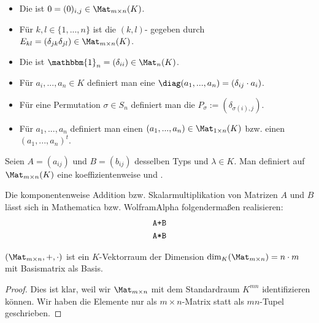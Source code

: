 \begin{example}
	\begin{itemize}
		\item Die  ist $0=(0)_{i,j} \in \Mat_{m\times n}(K)$.
		\item Für $k,l \in \{1,...,n\}$ ist die $(k,l)$- gegeben durch $E_{kl}=(\delta_{jk}\delta_{jl})\in 
		\Mat_{m\times n}(K)$.
		\item Die  ist $\mathbbm{1}_n=(\delta_{ii})\in \Mat_n(K)$.
		\item Für $a_i,...,a_n \in K$ definiert man eine  $\diag(a_1,...,a_n)=(\delta_{ij}\cdot a_i)$.
		\item Für eine Permutation $\sigma\in S_n$ definiert man die  $P_\sigma := (\delta_{\sigma
			(i),j})$.
		\item Für $a_1,...,a_n$ definiert man einen  $(a_1,...,a_n)\in \Mat_{1\times n}(K)$ bzw. einen 
		 $(a_1,...,a_n)^t$.
	\end{itemize}
\end{example}

\begin{definition}
	Seien $A=(a_{ij})$ und $B=(b_{ij})$ desselben Typs und 
	$\lambda \in K$. Man definiert auf $\Mat_{m\times n}(K)$ eine koeffizientenweise  und .
\end{definition}

\begin{mathematica}[Matrizenoperationen]
	Die komponentenweise Addition bzw. Skalarmultiplikation von Matrizen $A$ und $B$ lässt sich in Mathematica bzw. WolframAlpha folgendermaßen realisieren:
	\begin{align}
		\texttt{A+B}\notag \\
		\texttt{A*B}\notag
	\end{align}
\end{mathematica}

\begin{proposition}
	$(\Mat_{m\times n},+,\cdot)$ ist ein $K$-Vektorraum der Dimension $\dim_K(\Mat_{m\times n})=n\cdot m$ mit 
	Basismatrix als Basis.
\end{proposition}
\begin{proof}
	Dies ist klar, weil wir $\Mat_{m\times n}$ mit dem Standardraum $K^{mn}$ identifizieren können. Wir haben die 
	Elemente nur als $m\times n$-Matrix statt als $mn$-Tupel geschrieben.
\end{proof}

